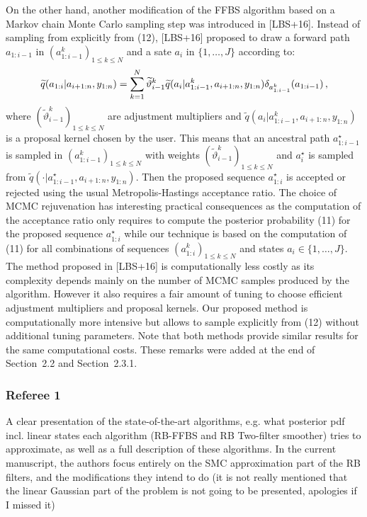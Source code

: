 {On the other hand, another modification of the FFBS algorithm based on a Markov chain Monte Carlo sampling step was introduced in [LBS+16]. Instead of sampling from  explicitly from (12), [LBS+16] proposed to draw a forward path $a_{1:i-1}$ in $(a^k_{1:i-1})_{1\le k \le N}$ and a sate $a_i$ in $\{1,\ldots,J\}$ according to:
\[
\widetilde{q}(a_{1:i}|a_{i+1:n},y_{1:n}) = \sum_{k=1}^N \widetilde{\vartheta}^k_{i-1}\widetilde{q}(a_{i}|a^k_{1:i-1},a_{i+1:n},y_{1:n})\delta_{a^k_{1:i-1}}(a_{1:i-1})\,,
\]
where $(\widetilde{\vartheta}^k_{i-1})_{1\le k \le N}$ are adjustment multipliers and $\widetilde{q}(a_{i}|a^k_{1:i-1},a_{i+1:n},y_{1:n})$ is a proposal kernel chosen by the user. This means that an ancestral path $a^{\star}_{1:i-1}$ is sampled in $(a^k_{1:i-1})_{1\le k \le N}$ with weights $(\widetilde{\vartheta}^k_{i-1})_{1\le k \le N}$ and $a^{\star}_i$ is sampled from $\widetilde{q}(\cdot|a^{\star}_{1:i-1},a_{i+1:n},y_{1:n})$. Then the proposed sequence $a^{\star}_{1:i}$ is accepted or rejected using the usual Metropolis-Hastings acceptance ratio. The choice of MCMC rejuvenation has interesting practical consequences as the computation of the acceptance ratio only requires to compute the posterior probability (11) for the proposed sequence $a^{\star}_{1:i}$ while our technique is based on the computation of  (11) for all combinations of sequences $(a^{k}_{1:i})_{1\le k \le N}$ and states $a_i\in\{1,\ldots,J\}$. The method proposed in [LBS+16] is computationally less costly as its complexity depends mainly on the number of MCMC samples produced by the algorithm. However it also requires a fair amount of tuning to choose efficient adjustment multipliers and proposal kernels. Our proposed method is computationally more intensive but allows to sample explicitly from (12) without additional tuning parameters. Note that both methods provide similar results for the same computational costs.
These remarks were added at the end of Section~2.2 and Section~2.3.1.
}

\subsubsection*{Referee 1}
A clear presentation of the state-of-the-art algorithms, e.g. what posterior pdf incl. linear states each algorithm (RB-FFBS and RB Two-filter smoother) tries to approximate, as well as a full description of these algorithms. In the current manuscript, the authors focus entirely on the SMC approximation part of the RB filters, and the modifications they intend to do (it is not really mentioned that the linear Gaussian part of the problem is not going to be presented, apologies if I missed it)

